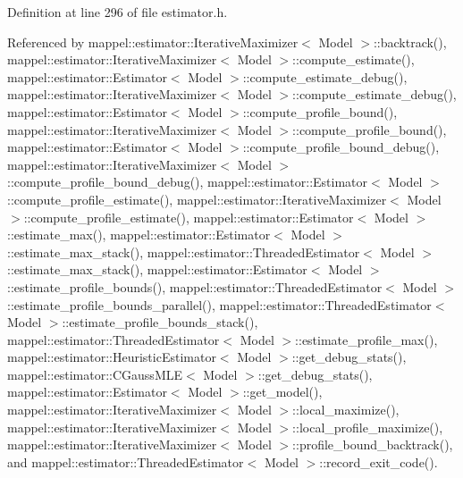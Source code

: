 Definition at line 296 of file estimator.\+h.



Referenced by mappel\+::estimator\+::\+Iterative\+Maximizer$<$ Model $>$\+::backtrack(), mappel\+::estimator\+::\+Iterative\+Maximizer$<$ Model $>$\+::compute\+\_\+estimate(), mappel\+::estimator\+::\+Estimator$<$ Model $>$\+::compute\+\_\+estimate\+\_\+debug(), mappel\+::estimator\+::\+Iterative\+Maximizer$<$ Model $>$\+::compute\+\_\+estimate\+\_\+debug(), mappel\+::estimator\+::\+Estimator$<$ Model $>$\+::compute\+\_\+profile\+\_\+bound(), mappel\+::estimator\+::\+Iterative\+Maximizer$<$ Model $>$\+::compute\+\_\+profile\+\_\+bound(), mappel\+::estimator\+::\+Estimator$<$ Model $>$\+::compute\+\_\+profile\+\_\+bound\+\_\+debug(), mappel\+::estimator\+::\+Iterative\+Maximizer$<$ Model $>$\+::compute\+\_\+profile\+\_\+bound\+\_\+debug(), mappel\+::estimator\+::\+Estimator$<$ Model $>$\+::compute\+\_\+profile\+\_\+estimate(), mappel\+::estimator\+::\+Iterative\+Maximizer$<$ Model $>$\+::compute\+\_\+profile\+\_\+estimate(), mappel\+::estimator\+::\+Estimator$<$ Model $>$\+::estimate\+\_\+max(), mappel\+::estimator\+::\+Estimator$<$ Model $>$\+::estimate\+\_\+max\+\_\+stack(), mappel\+::estimator\+::\+Threaded\+Estimator$<$ Model $>$\+::estimate\+\_\+max\+\_\+stack(), mappel\+::estimator\+::\+Estimator$<$ Model $>$\+::estimate\+\_\+profile\+\_\+bounds(), mappel\+::estimator\+::\+Threaded\+Estimator$<$ Model $>$\+::estimate\+\_\+profile\+\_\+bounds\+\_\+parallel(), mappel\+::estimator\+::\+Threaded\+Estimator$<$ Model $>$\+::estimate\+\_\+profile\+\_\+bounds\+\_\+stack(), mappel\+::estimator\+::\+Threaded\+Estimator$<$ Model $>$\+::estimate\+\_\+profile\+\_\+max(), mappel\+::estimator\+::\+Heuristic\+Estimator$<$ Model $>$\+::get\+\_\+debug\+\_\+stats(), mappel\+::estimator\+::\+C\+Gauss\+M\+L\+E$<$ Model $>$\+::get\+\_\+debug\+\_\+stats(), mappel\+::estimator\+::\+Estimator$<$ Model $>$\+::get\+\_\+model(), mappel\+::estimator\+::\+Iterative\+Maximizer$<$ Model $>$\+::local\+\_\+maximize(), mappel\+::estimator\+::\+Iterative\+Maximizer$<$ Model $>$\+::local\+\_\+profile\+\_\+maximize(), mappel\+::estimator\+::\+Iterative\+Maximizer$<$ Model $>$\+::profile\+\_\+bound\+\_\+backtrack(), and mappel\+::estimator\+::\+Threaded\+Estimator$<$ Model $>$\+::record\+\_\+exit\+\_\+code().

